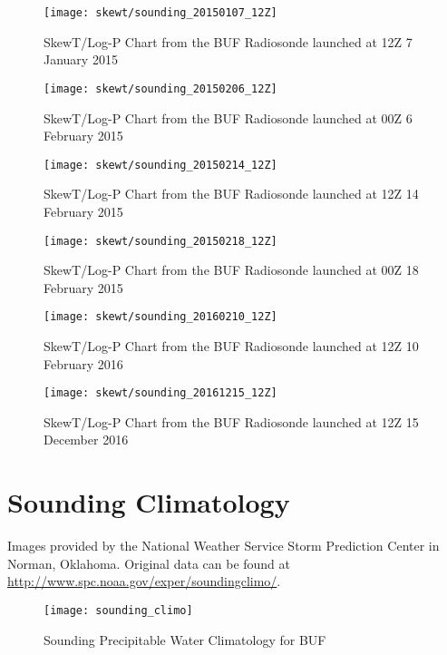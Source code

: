 \begin{figure}
\texttt{[image: skewt/sounding\_20150107\_12Z]}
\caption{SkewT/Log-P Chart from the BUF Radiosonde launched at 12Z 7 January 2015} 
\label{fig:skewt_20150107}
\end{figure}

\begin{figure}
\texttt{[image: skewt/sounding\_20150206\_12Z]}
\caption{SkewT/Log-P Chart from the BUF Radiosonde launched at 00Z 6 February 2015} 
\label{fig:skewt_20150206}
\end{figure}

\begin{figure}
\texttt{[image: skewt/sounding\_20150214\_12Z]}
\caption{SkewT/Log-P Chart from the BUF Radiosonde launched at 12Z 14 February 2015} 
\label{fig:skewt_20150214}
\end{figure}

\begin{figure}
\texttt{[image: skewt/sounding\_20150218\_12Z]}
\caption{SkewT/Log-P Chart from the BUF Radiosonde launched at 00Z 18 February 2015} 
\label{fig:skewt_20150218}
\end{figure}

\begin{figure}
\texttt{[image: skewt/sounding\_20160210\_12Z]}
\caption{SkewT/Log-P Chart from the BUF Radiosonde launched at 12Z 10 February 2016} 
\label{fig:skewt_20160210}
\end{figure}

\begin{figure}
\texttt{[image: skewt/sounding\_20161215\_12Z]}
\caption{SkewT/Log-P Chart from the BUF Radiosonde launched at 12Z 15 December 2016} 
\label{fig:skewt_20161215}
\end{figure}

\section{Sounding Climatology}
Images provided by the National Weather Service Storm Prediction Center in Norman, Oklahoma. Original data can be found at \url{http://www.spc.noaa.gov/exper/soundingclimo/}.
\begin{figure}
\texttt{[image: sounding\_climo]}
\caption{Sounding Precipitable Water Climatology for BUF} 
\label{fig:skewt_20161215}
\end{figure}